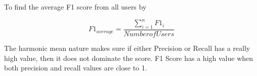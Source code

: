 To find the average F1 score from all users by

\begin{equation}
    \text{$F1_{average}$} = \frac{\sum_{i=1}^{n}F1_{i}}{Number of Users}
\end{equation}

The harmonic mean nature makes sure if either Precision or Recall has a really high value, then it does not dominate the score. F1 Score has a high value when both precision and recall values are close to 1.